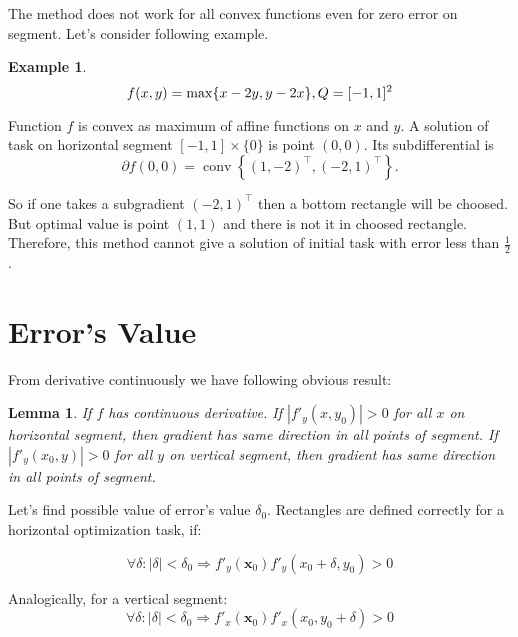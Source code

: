 \documentclass[12pt]{article}
\DeclareMathOperator{\conv}{conv}
\newtheorem{lemma}{Lemma}
\begin{document}
The method does not work for all convex functions even for zero error on segment. Let's consider following example.

\textbf{Example 1}.
\begin{equation}
f(x,y) = \max\{x-2y, y-2x\}, \\
Q = [-1, 1]^2
\end{equation}

Function $f$ is convex as maximum of affine functions on $x$ and $y$. A solution of task on horizontal segment $[-1, 1]\times\{0\}$ is point $(0, 0)$. Its subdifferential is $$\partial f(0,0) = \conv\left\{(1, -2)^\top, (-2,1)^\top\right\}.$$ 

So if one takes a subgradient $(-2, 1)^\top$ then a bottom rectangle will be choosed. But optimal value is point $(1,1)$ and there is not it in choosed rectangle. Therefore, this method cannot give a solution of initial task with error less than $\frac{1}{2}$.

\section{Error's Value}

From derivative continuously we have following obvious result:

\begin{lemma}
If $f$ has continuous derivative. If $|f'_y(x, y_0)| > 0$ for all $x$ on horizontal segment, then gradient has same direction in all points of segment. If $|f'_y(x_0, y)| > 0$ for all $y$ on vertical segment, then gradient has same direction in all points of segment.
\end{lemma}

Let's find possible value of error's value $\delta_0$. Rectangles are defined correctly for a horizontal optimization task, if:

\begin{equation}\label{1}
\forall\delta : |\delta| < \delta_0 \Rightarrow f'_y(\textbf{x}_0)f'_y(x_0+\delta, y_0) > 0
\end{equation}

Analogically, for a vertical segment:
\begin{equation}
\forall\delta: |\delta| < \delta_0 \Rightarrow f'_x(\textbf{x}_0)f'_x(x_0, y_0+\delta) > 0
\end{equation}
\end{document}

